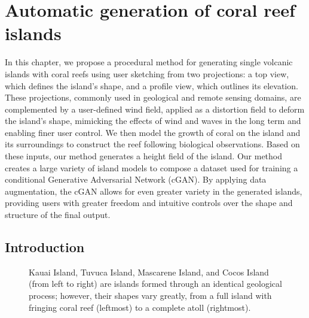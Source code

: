 \resetgraphicspath
{}

\chapter{Automatic generation of coral reef islands}
\label{chap:coral-island}

\abstract
In this chapter, we propose a procedural method for generating single volcanic islands with coral reefs using user sketching from two projections: a top view, which defines the island's shape, and a profile view, which outlines its elevation. These projections, commonly used in geological and remote sensing domains, are complemented by a user-defined wind field, applied as a distortion field to deform the island's shape, mimicking the effects of wind and waves in the long term and enabling finer user control. We then model the growth of coral on the island and its surroundings to construct the reef following biological observations. Based on these inputs, our method generates a height field of the island. Our method creates a large variety of island models to compose a dataset used for training a conditional Generative Adversarial Network (cGAN). By applying data augmentation, the cGAN allows for even greater variety in the generated islands, providing users with greater freedom and intuitive controls over the shape and structure of the final output.
\pagebreak

\minitoc

\section{Introduction}
\label{sec:coral-island-introduction}

\begin{figure}[H]
\caption{Kauai Island, Tuvuca Island, Mascarene Island, and Cocos Island (from left to right) are islands formed through an identical geological process; however, their shapes vary greatly, from a full island with fringing coral reef (leftmost) to a complete atoll (rightmost).}
\label{fig:coral-island-island-examples}
\end{figure}

